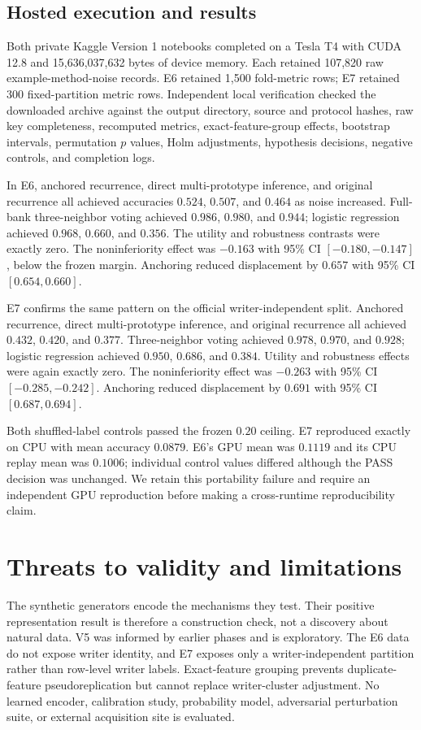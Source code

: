 \documentclass[11pt]{article}
\begin{document}
\subsection{Hosted execution and results}
Both private Kaggle Version 1 notebooks completed on a Tesla T4 with CUDA 12.8 and 15,636,037,632 bytes of device memory. Each retained 107,820 raw example-method-noise records. E6 retained 1,500 fold-metric rows; E7 retained 300 fixed-partition metric rows. Independent local verification checked the downloaded archive against the output directory, source and protocol hashes, raw key completeness, recomputed metrics, exact-feature-group effects, bootstrap intervals, permutation $p$ values, Holm adjustments, hypothesis decisions, negative controls, and completion logs.




In E6, anchored recurrence, direct multi-prototype inference, and original recurrence all achieved accuracies $0.524$, $0.507$, and $0.464$ as noise increased. Full-bank three-neighbor voting achieved $0.986$, $0.980$, and $0.944$; logistic regression achieved $0.968$, $0.660$, and $0.356$. The utility and robustness contrasts were exactly zero. The noninferiority effect was $-0.163$ with 95\% CI $[-0.180,-0.147]$, below the frozen margin. Anchoring reduced displacement by $0.657$ with 95\% CI $[0.654,0.660]$.

E7 confirms the same pattern on the official writer-independent split. Anchored recurrence, direct multi-prototype inference, and original recurrence all achieved $0.432$, $0.420$, and $0.377$. Three-neighbor voting achieved $0.978$, $0.970$, and $0.928$; logistic regression achieved $0.950$, $0.686$, and $0.384$. Utility and robustness effects were again exactly zero. The noninferiority effect was $-0.263$ with 95\% CI $[-0.285,-0.242]$. Anchoring reduced displacement by $0.691$ with 95\% CI $[0.687,0.694]$.

Both shuffled-label controls passed the frozen $0.20$ ceiling. E7 reproduced exactly on CPU with mean accuracy $0.0879$. E6's GPU mean was $0.1119$ and its CPU replay mean was $0.1006$; individual control values differed although the PASS decision was unchanged. We retain this portability failure and require an independent GPU reproduction before making a cross-runtime reproducibility claim.

\section{Threats to validity and limitations}
The synthetic generators encode the mechanisms they test. Their positive representation result is therefore a construction check, not a discovery about natural data. V5 was informed by earlier phases and is exploratory. The E6 data do not expose writer identity, and E7 exposes only a writer-independent partition rather than row-level writer labels. Exact-feature grouping prevents duplicate-feature pseudoreplication but cannot replace writer-cluster adjustment. No learned encoder, calibration study, probability model, adversarial perturbation suite, or external acquisition site is evaluated.
\end{document}
